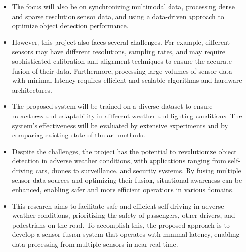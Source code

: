 \documentclass[rnd]{mas_proposal}
\begin{document}
\begin{itemize}
    \item The focus will also be on synchronizing multimodal data, processing dense and sparse resolution sensor data, and using a data-driven approach to optimize object detection performance.

    \item However, this project also faces several challenges. For example, different sensors may have different resolutions, sampling rates, and may require sophisticated calibration and alignment techniques to ensure the accurate fusion of their data. Furthermore, processing large volumes of sensor data with minimal latency requires efficient and scalable algorithms and hardware architectures.

    \item The proposed system will be trained on a diverse dataset to ensure robustness and adaptability in different weather and lighting conditions. The system's effectiveness will be evaluated by extensive experiments and by comparing existing state-of-the-art methods.

    \item Despite the challenges, the project has the potential to revolutionize object detection in adverse weather conditions, with applications ranging from self-driving cars, drones to surveillance, and security systems. By fusing multiple sensor data sources and optimizing their fusion, situational awareness can be enhanced, enabling safer and more efficient operations in various domains.

    \item This research aims to facilitate safe and efficient self-driving in adverse weather conditions, prioritizing the safety of passengers, other drivers, and pedestrians on the road. To accomplish this, the proposed approach is to develop a sensor fusion system that operates with minimal latency, enabling data processing from multiple sensors in near real-time.


\end{itemize}
\end{document}
